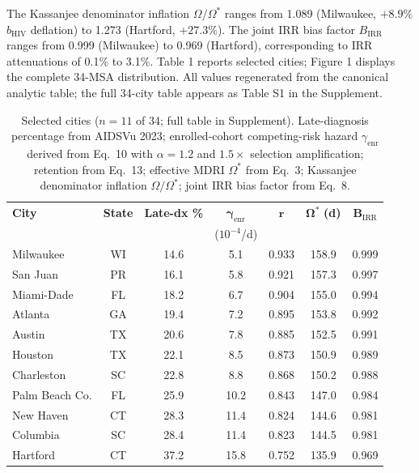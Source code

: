 \documentclass[12pt]{article}
\begin{document}
The Kassanjee denominator inflation $\Omega/\Omega^*$ ranges from 1.089 (Milwaukee, $+8.9\%$ $b_{\mathrm{HIV}}$ deflation) to 1.273 (Hartford, $+27.3\%$). The joint IRR bias factor $B_{\mathrm{IRR}}$ ranges from 0.999 (Milwaukee) to 0.969 (Hartford), corresponding to IRR attenuations of 0.1\% to 3.1\%. Table 1 reports selected cities; Figure 1 displays the complete 34-MSA distribution. All values regenerated from the canonical analytic table; the full 34-city table appears as Table S1 in the Supplement.

\begin{table}[H]
\centering
\caption{Selected cities ($n = 11$ of 34; full table in Supplement). Late-diagnosis percentage from AIDSVu 2023; enrolled-cohort competing-risk hazard $\gamma_{\mathrm{enr}}$ derived from Eq.\ 10 with $\alpha = 1.2$ and $1.5\times$ selection amplification; retention from Eq.\ 13; effective MDRI $\Omega^*$ from Eq.\ 3; Kassanjee denominator inflation $\Omega/\Omega^*$; joint IRR bias factor from Eq.\ 8.}
\label{tab:selected_cities}
\small
\begin{tabular}{lcccccc}
\toprule
\textbf{City} & \textbf{State} & \textbf{Late-dx \%} & $\boldsymbol{\gamma_{\mathrm{enr}}}$ & $\boldsymbol{r}$ & $\boldsymbol{\Omega^*}$ \textbf{(d)} & $\boldsymbol{B_{\mathrm{IRR}}}$ \\
 & & & ($10^{-4}$/d) & & & \\
\midrule
Milwaukee & WI & 14.6 & 5.1 & 0.933 & 158.9 & 0.999 \\
San Juan & PR & 16.1 & 5.8 & 0.921 & 157.3 & 0.997 \\
Miami-Dade & FL & 18.2 & 6.7 & 0.904 & 155.0 & 0.994 \\
Atlanta & GA & 19.4 & 7.2 & 0.895 & 153.8 & 0.992 \\
Austin & TX & 20.6 & 7.8 & 0.885 & 152.5 & 0.991 \\
Houston & TX & 22.1 & 8.5 & 0.873 & 150.9 & 0.989 \\
Charleston & SC & 22.8 & 8.8 & 0.868 & 150.2 & 0.988 \\
Palm Beach Co. & FL & 25.9 & 10.2 & 0.843 & 147.0 & 0.984 \\
New Haven & CT & 28.3 & 11.4 & 0.824 & 144.6 & 0.981 \\
Columbia & SC & 28.4 & 11.4 & 0.823 & 144.5 & 0.981 \\
Hartford & CT & 37.2 & 15.8 & 0.752 & 135.9 & 0.969 \\
\bottomrule
\end{tabular}
\end{table}
\end{document}
